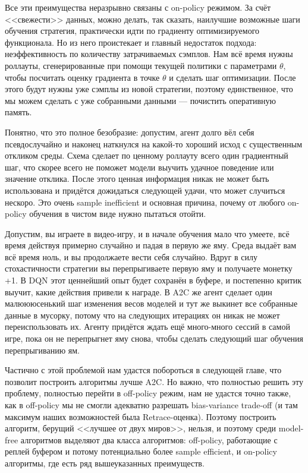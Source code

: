 Все эти преимущества неразрывно связаны с on-policy режимом. За счёт <<свежести>> данных, можно делать, так сказать, наилучшие возможные шаги обучения стратегия, практически идти по градиенту оптимизируемого функционала. Но из него проистекает и главный недостаток подхода: неэффективность по количеству затрачиваемых сэмплов. Нам всё время нужны роллауты, сгенерированные при помощи текущей политики с параметрами $\theta$, чтобы посчитать оценку градиента в точке $\theta$ и сделать шаг оптимизации. После этого будут нужны уже сэмплы из новой стратегии, поэтому единственное, что мы можем сделать с уже собранными данными --- почистить оперативную память.

Понятно, что это полное безобразие: допустим, агент долго вёл себя псевдослучайно и наконец наткнулся на какой-то хороший исход с существенным откликом среды. Схема сделает по ценному роллауту всего один градиентный шаг, что скорее всего не поможет модели выучить удачное поведение или значение отклика. После этого ценная информация никак не может быть использована и придётся дожидаться следующей удачи, что может случиться нескоро. Это очень sample inefficient и основная причина, почему от любого on-policy обучения в чистом виде нужно пытаться отойти.

\begin{example}
Допустим, вы играете в видео-игру, и в начале обучения мало что умеете, всё время действуя примерно случайно и падая в первую же яму. Среда выдаёт вам всё время ноль, и вы продолжаете вести себя случайно. Вдруг в силу стохастичности стратегии вы перепрыгиваете первую яму и получаете монетку +1. В DQN этот ценнейший опыт будет сохранён в буфере, и постепенно критик выучит, какие действия привели к награде. В A2C же агент сделает один малюююсенький шаг изменения весов моделей и тут же выкинет все собранные данные в мусорку, потому что на следующих итерациях он никак не может переиспользовать их. Агенту придётся ждать ещё много-много сессий в самой игре, пока он не перепрыгнет яму снова, чтобы сделать следующий шаг обучения перепрыгиванию ям.
\end{example}

Частично с этой проблемой нам удастся побороться в следующей главе, что позволит построить алгоритмы лучше A2C. Но важно, что полностью решить эту проблему, полностью перейти в off-policy режим, нам не удастся точно также, как в off-policy мы не смогли адекватно разрешать bias-variance trade-off (и там максимум наших возможностей была Retrace-оценка). Поэтому построить алгоритм, берущий <<лучшее от двух миров>>, нельзя, и поэтому среди model-free алгоритмов выделяют два класса алгоритмов: off-policy, работающие с реплей буфером и потому потенциально более sample efficient, и on-policy алгоритмы, где есть ряд вышеуказанных преимуществ.